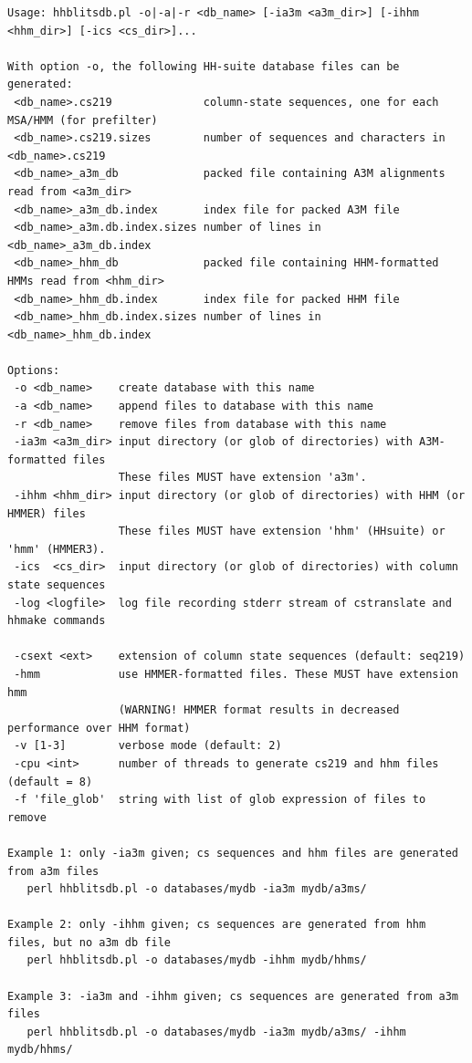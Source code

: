 \documentclass[11pt,a4paper]{article}
\begin{document}
\small 
\begin{verbatim}
Usage: hhblitsdb.pl -o|-a|-r <db_name> [-ia3m <a3m_dir>] [-ihhm <hhm_dir>] [-ics <cs_dir>]... 

With option -o, the following HH-suite database files can be generated:
 <db_name>.cs219              column-state sequences, one for each MSA/HMM (for prefilter)
 <db_name>.cs219.sizes        number of sequences and characters in <db_name>.cs219
 <db_name>_a3m_db             packed file containing A3M alignments read from <a3m_dir>
 <db_name>_a3m_db.index       index file for packed A3M file
 <db_name>_a3m.db.index.sizes number of lines in <db_name>_a3m_db.index
 <db_name>_hhm_db             packed file containing HHM-formatted HMMs read from <hhm_dir>
 <db_name>_hhm_db.index       index file for packed HHM file
 <db_name>_hhm_db.index.sizes number of lines in <db_name>_hhm_db.index

Options:
 -o <db_name>    create database with this name
 -a <db_name>    append files to database with this name
 -r <db_name>    remove files from database with this name
 -ia3m <a3m_dir> input directory (or glob of directories) with A3M-formatted files
                 These files MUST have extension 'a3m'.
 -ihhm <hhm_dir> input directory (or glob of directories) with HHM (or HMMER) files 
                 These files MUST have extension 'hhm' (HHsuite) or 'hmm' (HMMER3). 
 -ics  <cs_dir>  input directory (or glob of directories) with column state sequences
 -log <logfile>  log file recording stderr stream of cstranslate and hhmake commands

 -csext <ext>    extension of column state sequences (default: seq219)
 -hmm            use HMMER-formatted files. These MUST have extension hmm
                 (WARNING! HMMER format results in decreased performance over HHM format)
 -v [1-3]        verbose mode (default: 2)
 -cpu <int>      number of threads to generate cs219 and hhm files (default = 8)
 -f 'file_glob'  string with list of glob expression of files to remove
 
Example 1: only -ia3m given; cs sequences and hhm files are generated from a3m files
   perl hhblitsdb.pl -o databases/mydb -ia3m mydb/a3ms/ 

Example 2: only -ihhm given; cs sequences are generated from hhm files, but no a3m db file 
   perl hhblitsdb.pl -o databases/mydb -ihhm mydb/hhms/ 

Example 3: -ia3m and -ihhm given; cs sequences are generated from a3m files
   perl hhblitsdb.pl -o databases/mydb -ia3m mydb/a3ms/ -ihhm mydb/hhms/   


\end{verbatim}
\end{document}
